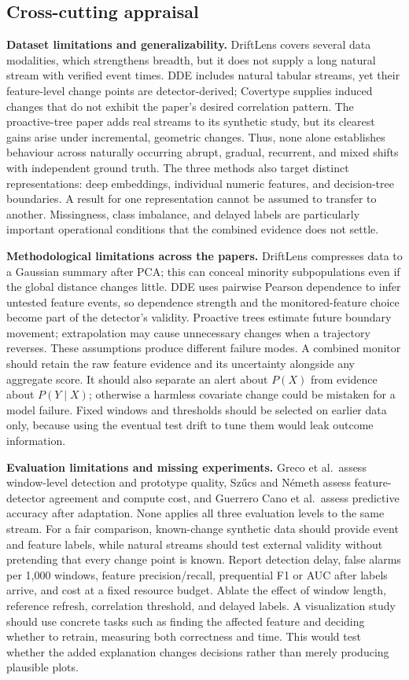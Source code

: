 \documentclass[10pt,a4paper]{article}
\begin{document}
\subsection*{Cross-cutting appraisal}
\textbf{Dataset limitations and generalizability.} DriftLens covers several data modalities, which strengthens breadth, but it does not supply a long natural stream with verified event times. DDE includes natural tabular streams, yet their feature-level change points are detector-derived; Covertype supplies induced changes that do not exhibit the paper's desired correlation pattern. The proactive-tree paper adds real streams to its synthetic study, but its clearest gains arise under incremental, geometric changes. Thus, none alone establishes behaviour across naturally occurring abrupt, gradual, recurrent, and mixed shifts with independent ground truth. The three methods also target distinct representations: deep embeddings, individual numeric features, and decision-tree boundaries. A result for one representation cannot be assumed to transfer to another. Missingness, class imbalance, and delayed labels are particularly important operational conditions that the combined evidence does not settle.

\textbf{Methodological limitations across the papers.} DriftLens compresses data to a Gaussian summary after PCA; this can conceal minority subpopulations even if the global distance changes little. DDE uses pairwise Pearson dependence to infer untested feature events, so dependence strength and the monitored-feature choice become part of the detector's validity. Proactive trees estimate future boundary movement; extrapolation may cause unnecessary changes when a trajectory reverses. These assumptions produce different failure modes. A combined monitor should retain the raw feature evidence and its uncertainty alongside any aggregate score. It should also separate an alert about $P(X)$ from evidence about $P(Y\mid X)$; otherwise a harmless covariate change could be mistaken for a model failure. Fixed windows and thresholds should be selected on earlier data only, because using the eventual test drift to tune them would leak outcome information.

\textbf{Evaluation limitations and missing experiments.} Greco et al.\ assess window-level detection and prototype quality, Sz\H{u}cs and N\'emeth assess feature-detector agreement and compute cost, and Guerrero Cano et al.\ assess predictive accuracy after adaptation. None applies all three evaluation levels to the same stream. For a fair comparison, known-change synthetic data should provide event and feature labels, while natural streams should test external validity without pretending that every change point is known. Report detection delay, false alarms per 1,000 windows, feature precision/recall, prequential F1 or AUC after labels arrive, and cost at a fixed resource budget. Ablate the effect of window length, reference refresh, correlation threshold, and delayed labels. A visualization study should use concrete tasks such as finding the affected feature and deciding whether to retrain, measuring both correctness and time. This would test whether the added explanation changes decisions rather than merely producing plausible plots.
\end{document}
